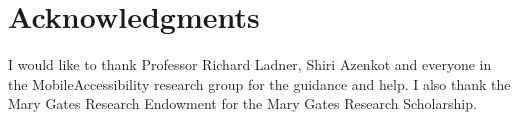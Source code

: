 \section{Acknowledgments}
\label{sec:acknowledge}
I would like to thank Professor Richard Ladner, Shiri Azenkot and everyone in the MobileAccessibility research group for the guidance and help. I also thank the Mary Gates Research Endowment for the Mary Gates Research Scholarship.